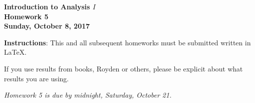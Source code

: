 \documentclass{article}%
\begin{document}
\begin{center}
\textbf{Introduction to Analysis $I$\\Homework 5\\Sunday, October 8, 2017}\bigskip
\end{center}

\noindent\textbf{Instructions}: This and all subsequent homeworks must be submitted written in \LaTeX.

\noindent If you use results from books, Royden or others, please be explicit about what results you are using.



\begin{center}
\emph{Homework 5 is due by midnight, Saturday, October 21.}
\end{center} 
\medskip
\end{document}

